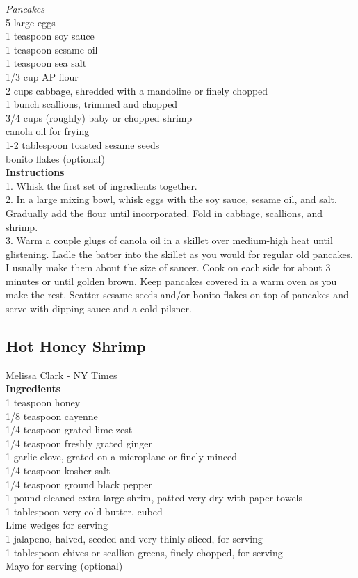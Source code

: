 \documentclass{article}
\numberwithin{figure}{section}
\numberwithin{equation}{section}
\begin{document}
{\it Pancakes}\\
5 large eggs\\
1 teaspoon soy sauce\\
1 teaspoon sesame oil\\
1 teaspoon sea salt\\
1/3 cup AP flour\\
2 cups cabbage, shredded with a mandoline or finely chopped\\
1 bunch scallions, trimmed and chopped\\
3/4 cups (roughly) baby or chopped shrimp\\
canola oil for frying\\
1-2 tablespoon toasted sesame seeds\\
bonito flakes (optional)\\

{\bf Instructions}\\
1.	Whisk the first set of ingredients together.\\

2.	In a large mixing bowl, whisk eggs with the soy sauce, sesame oil, and salt. Gradually add the flour until incorporated. Fold in cabbage, scallions, and shrimp.\\

3.	Warm a couple glugs of canola oil in a skillet over medium-high heat until glistening. Ladle the batter into the skillet as you would for regular old pancakes. I usually make them about the size of saucer. Cook on each side for about 3 minutes or until golden brown. Keep pancakes covered in a warm oven as you make the rest. Scatter sesame seeds and/or bonito flakes on top of pancakes and serve with dipping sauce and a cold pilsner.


\pagebreak
\subsection{Hot Honey Shrimp}
Melissa Clark - NY Times\\

{\bf Ingredients}\\
1 teaspoon honey\\
1/8 teaspoon cayenne\\
1/4 teaspoon grated lime zest\\
1/4 teaspoon freshly grated ginger\\
1 garlic clove, grated on a microplane or finely minced\\
1/4 teaspoon kosher salt\\
1/4 teaspoon ground black pepper\\
1 pound cleaned extra-large shrim, patted very dry with paper towels\\
1 tablespoon very cold butter, cubed\\
Lime wedges for serving\\
1 jalapeno, halved, seeded and very thinly sliced, for serving\\
1 tablespoon chives or scallion greens, finely chopped, for serving\\
Mayo for serving (optional)\\
\end{document}
